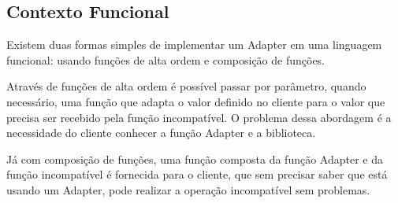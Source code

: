 \subsection*{Contexto Funcional}

Existem duas formas simples de implementar um Adapter em uma linguagem 
funcional: usando funções de alta ordem e composição de funções.

Através de funções de alta ordem é possível passar por parâmetro, 
quando necessário, uma função que adapta o valor definido no cliente 
para o valor que precisa ser recebido pela função incompatível. O 
problema dessa abordagem é a necessidade do cliente conhecer a função 
Adapter e a biblioteca.

Já com composição de funções, uma função composta da função Adapter 
e da função incompatível é fornecida para o cliente, que sem precisar 
saber que está usando um Adapter, pode realizar a operação incompatível 
sem problemas.

\begin{lstlisting}[caption={Adapter Funcional},label=fpadapter]
    

    
\end{lstlisting}